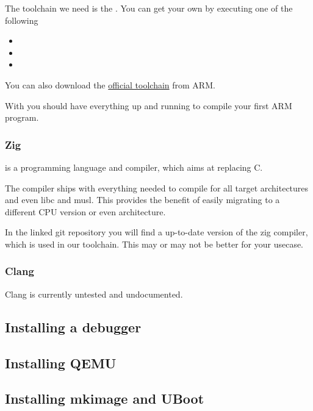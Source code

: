     The toolchain we need is the . You can get your own by executing one of the following
    \begin{itemize}
        \item {}
        \item {}
        \item {}
    \end{itemize}

    You can also download the \href{https://developer.arm.com/tools-and-software/open-source-software/developer-tools/gnu-toolchain/gnu-rm/downloads}{official toolchain} from ARM.

    With  you should have everything up and running to compile your first ARM program.

    \subsubsection{Zig}

    \zig{} is a programming language and compiler, which aims at replacing C\@.

    The \zig{} compiler ships with everything needed to compile for all target architectures and even libc and musl.
    This provides the benefit of easily migrating to a different CPU version or even architecture.

    In the linked git repository you will find a up-to-date version of the zig compiler, which is used in our toolchain.
    This may or may not be better for your usecase.

    \subsubsection{Clang}

    Clang is currently untested and undocumented.

    \subsection{Installing a debugger}

    \subsection{Installing QEMU}

    \subsection{Installing mkimage and UBoot}


